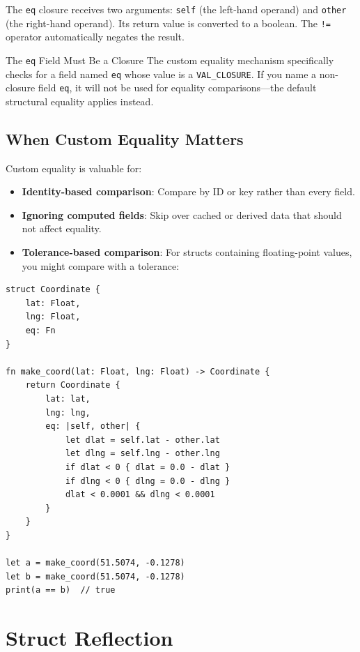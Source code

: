 The \lstinline|eq| closure receives two arguments: \lstinline|self| (the
left-hand operand) and \lstinline|other| (the right-hand operand). Its
return value is converted to a boolean. The \lstinline|!=| operator
automatically negates the result.

\begin{warnbox}{The \texttt{eq} Field Must Be a Closure}
The custom equality mechanism specifically checks for a field named
\lstinline|eq| whose value is a \lstinline|VAL_CLOSURE|. If you name a
non-closure field \lstinline|eq|, it will not be used for equality
comparisons---the default structural equality applies instead.
\end{warnbox}

\subsection{When Custom Equality Matters}

Custom equality is valuable for:

\begin{itemize}
  \item \textbf{Identity-based comparison}: Compare by ID or key rather
    than every field.
  \item \textbf{Ignoring computed fields}: Skip over cached or derived
    data that should not affect equality.
  \item \textbf{Tolerance-based comparison}: For structs containing
    floating-point values, you might compare with a tolerance:
\end{itemize}

\begin{lstlisting}[language=Lattice, caption={Approximate equality for geometry}]
struct Coordinate {
    lat: Float,
    lng: Float,
    eq: Fn
}

fn make_coord(lat: Float, lng: Float) -> Coordinate {
    return Coordinate {
        lat: lat,
        lng: lng,
        eq: |self, other| {
            let dlat = self.lat - other.lat
            let dlng = self.lng - other.lng
            if dlat < 0 { dlat = 0.0 - dlat }
            if dlng < 0 { dlng = 0.0 - dlng }
            dlat < 0.0001 && dlng < 0.0001
        }
    }
}

let a = make_coord(51.5074, -0.1278)
let b = make_coord(51.5074, -0.1278)
print(a == b)  // true
\end{lstlisting}

\section{Struct Reflection}\label{sec:struct-reflection}

